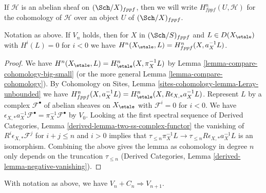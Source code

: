 \noindent
If $\mathcal{H}$ is an abelian sheaf on $(\Sch/X)_{fppf}$,
then we will write $H^n_{fppf}(U, \mathcal{H})$ for the cohomology
of $\mathcal{H}$ over an object $U$ of $(\Sch/X)_{fppf}$.

\begin{lemma}
\label{lemma-V-implies-cohomology-etale-fppf}
Notation as above. If $V_n$ holds, then for
$X$ in $(\Sch/S)_{fppf}$ and $L \in D(X_\etale)$
with $H^i(L) = 0$ for $i < 0$
we have $H^n(X_\etale, L) = H^n_{fppf}(X, a_X^{-1}L)$.
\end{lemma}

\begin{proof}
We have $H^n(X_\etale, L) = H^n_\etale(X, \pi_X^{-1}L)$ by
Lemma \ref{lemma-compare-cohomology-big-small} (or the more general
Lemma \ref{lemma-compare-cohomology}).
By Cohomology on Sites, Lemma \ref{sites-cohomology-lemma-Leray-unbounded}
we have
$H^n_{fppf}(X, a_X^{-1}L) = H^n_\etale(X, R\epsilon_{X, *}a_X^{-1}L)$.
Represent $L$ by a complex $\mathcal{F}^\bullet$ of abelian
sheaves on $X_\etale$ with $\mathcal{F}^i = 0$ for $i < 0$. We have
$\epsilon_{X, *} a_X^{-1} \mathcal{F}^\bullet = \pi_X^{-1} \mathcal{F}^\bullet$
by $V_0$.
Looking at the first spectral sequence of
Derived Categories, Lemma \ref{derived-lemma-two-ss-complex-functor}
the vanishing of $R^i\epsilon_{X, *}\mathcal{F}^j$ for
$i + j \leq n$ and $i > 0$ implies that
$\tau_{\leq n} \pi_X^{-1} L \to \tau_{\leq n} R\epsilon_{X, *}a_X^{-1}L$
is an isomorphism. Combining the above gives the lemma
as cohomology in degree $n$ only depends on the truncation
$\tau_{\leq n}$ (Derived Categories, Lemma
\ref{derived-lemma-negative-vanishing}).
\end{proof}

\begin{lemma}
\label{lemma-induction-step-V-C-etale-fppf}
With notation as above, we have $V_n + C_n \Rightarrow V_{n + 1}$.
\end{lemma}

